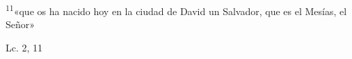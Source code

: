 \documentclass[../../rosario.tex]{subfiles}
\begin{document}
    \textsuperscript{11}«que os ha nacido hoy en la ciudad de David un Salvador, que es el Mesías, el Señor»
    \begin{flushright}
    Lc. 2, 11       
    \end{flushright}
\end{document}
